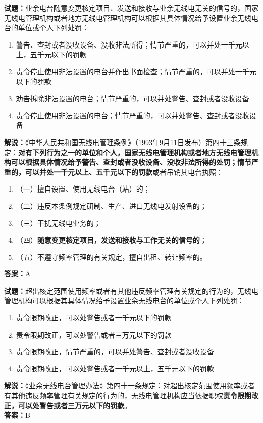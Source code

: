 \documentclass{ctexbook}
\begin{document}
\noindent\textbf{试题：}业余电台随意变更核定项目、发送和接收与业余无线电无关的信号的，国家无线电管理机构或者地方无线电管理机构可以根据其具体情况给予设置业余无线电台的单位或个人下列处罚：
\begin{enumerate}[leftmargin=3em]
  \item  警告、查封或者没收设备、没收非法所得；情节严重的，可以并处一千元以上，五千元以下的罚款
  \item  责令停止使用非法设置的电台并作出书面检查；情节严重的，可以并处一千元以下的罚款
  \item  劝告拆除非法设置的电台；情节严重的，可以并处警告、查封或者没收设备
  \item  责令停止使用非法设置的电台；情节严重的，可以并处警告、查封或者没收设备
\end{enumerate}
\noindent\textbf{解说：}《中华人民共和国无线电管理条例》（1993年9月11日发布）第四十三条规定：\textbf{对有下列行为之一的单位和个人，国家无线电管理机构或者地方无线电管理机构可以根据具体情况给予警告、查封或者没收设备、没收非法所得的处罚；情节严重的，可以并处一千元以上、五千元以下的罚款}或者吊销其电台执照：
\begin{enumerate}[leftmargin=3em, label=]
  \item（一）擅自设置、使用无线电台（站）的；
  \item（二）违反本条例规定研制、生产、进口无线电发射设备的；
  \item（三）干扰无线电业务的；
  \item（四）\textbf{随意变更核定项目，发送和接收与工作无关的信号的}；
  \item（五）不遵守频率管理的有关规定，擅自出租、转让频率的。
\end{enumerate}
\textbf{答案：}A

\bigskip

\noindent\textbf{试题：}超出核定范围使用频率或者有其他违反频率管理有关规定的行为的，无线电管理机构可以根据其具体情况给予设置业余无线电台的单位或个人下列处罚：
\begin{enumerate}[leftmargin=3em]
  \item 责令限期改正，可以处警告或者一千元以下的罚款
  \item 责令限期改正，可以处警告或者三万元以下的罚款
  \item 责令限期改正，情节严重的，可以并处警告、查封或者没收设备
  \item 责令限期改正，可以处警告或者一千元以上，五千元以下的罚款
\end{enumerate}
\noindent\textbf{解说：}《业余无线电台管理办法》第四十一条规定：对超出核定范围使用频率或者有其他违反频率管理有关规定的行为的，无线电管理机构应当依据职权\textbf{责令限期改正，可以处警告或者三万元以下的罚款}。\\\textbf{答案：}B
\end{document}
